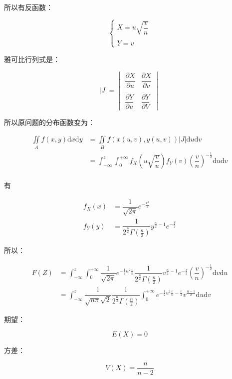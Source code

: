 \documentclass[12pt, a4paper, oneside]{ctexbook}
\begin{document}
所以有反函数：

$$
\begin{cases}
X = u\sqrt{\dfrac{v}{n}} \\
\\
Y = v
\end{cases}
$$

雅可比行列式是：

$$
|J| = \begin{vmatrix}
\dfrac{\partial X}{\partial u} & \dfrac{\partial X}{\partial v} \\
\\
\dfrac{\partial Y}{\partial u} & \dfrac{\partial Y}{\partial V}
\end{vmatrix}
$$

所以原问题的分布函数变为：

$$
\begin{aligned}
\iint\limits_{A}f(x,y)\mathrm{d}x\mathrm{d}y &= \iint\limits_{B}f(x(u, v),y(u, v)) |J| \mathrm{d}u \mathrm{d}v \\
&= \int_{-\infty}^{z}\int_{0}^{+\infty}f_X(u\sqrt{\dfrac{v}{u}})f_Y(v) (\dfrac{v}{n})^{-\frac{1}{2}} \mathrm{d}u \mathrm{d}v \\

\end{aligned}
$$

有

$$
\begin{aligned}
f_X(x) &= \dfrac{1}{\sqrt{2\pi}}e^{-\frac{x^{2}}{2}} \\
f_Y(y) &= \dfrac{1}{2^{\frac{n}{2}}\Gamma(\frac{n}{2})}y^{\frac{n}{2}- 1}e^{-\frac{y}{2}}
\end{aligned}
$$

所以：

$$
\begin{aligned}
F(Z) &= \int_{-\infty}^{z}\int_0^{+\infty} \dfrac{1}{\sqrt{2\pi}}e^{-\frac{1}{2}u^{2}\frac{v}{n}} \dfrac{1}{2^{\frac{n}{2}}\Gamma(\frac{n}{2})}v^{\frac{n}{2} - 1} e^{-\frac{v}{2}}(\dfrac{v}{n})^{-\frac{1}{2}} \mathrm{d}v\mathrm{d}u \\
&= \int_{-\infty}^{z}\dfrac{1}{\sqrt{n\pi}\sqrt{2}}\dfrac{1}{2^{\frac{n}{2}} \Gamma(\frac{n}{2})} \int_0^{+\infty}e^{-\frac{1}{2}u^{2}\frac{v}{n} - \frac{v}{2}}v^{\frac{n - 1}{2}} \mathrm{d}u \mathrm{d}v
\end{aligned}
$$

 期望：

$$
E(X) = 0
$$

 方差：

$$
V(X) = \dfrac{n}{n - 2}
$$
\end{document}
